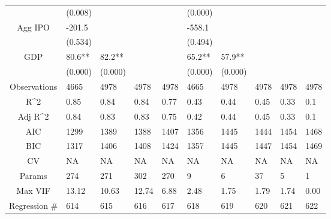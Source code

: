 \documentclass{article}
\begin{document}
\begin{table}[H]
\begin{tabular}{|clllllllll|}
   & (0.008) &  &  &  & (0.000) &  &  &  &  \\
  Agg IPO & -201.5 &  &  &  & -558.1 &  &  &  &  \\
   & (0.534) &  &  &  & (0.494) &  &  &  &  \\
  GDP & 80.6** & 82.2** &  &  & 65.2** & 57.9** &  &  &  \\
   & (0.000) & (0.000) &  &  & (0.000) & (0.000) &  &  &  \\
  \hline
 Observations & 4665 & 4978 & 4978 & 4978 & 4665 & 4978 & 4978 & 4978 & 4978 \\
  R^2 & 0.85 & 0.84 & 0.84 & 0.77 & 0.43 & 0.44 & 0.45 & 0.33 & 0.1 \\
  Adj R^2 & 0.84 & 0.83 & 0.83 & 0.75 & 0.42 & 0.44 & 0.45 & 0.33 & 0.1 \\
  AIC & 1299 & 1389 & 1388 & 1407 & 1356 & 1445 & 1444 & 1454 & 1468 \\
  BIC & 1317 & 1406 & 1408 & 1424 & 1357 & 1445 & 1447 & 1454 & 1469 \\
  CV & NA & NA & NA & NA & NA & NA & NA & NA & NA \\
  Params & 274 & 271 & 302 & 270 & 9 & 6 & 37 & 5 & 1 \\
  Max VIF & 13.12 & 10.63 & 12.74 & 6.88 & 2.48 & 1.75 & 1.79 & 1.74 & 0.00 \\
  Regression \# & 614 & 615 & 616 & 617 & 618 & 619 & 620 & 621 & 622 \\
   \hline
\end{tabular}

\end{table}
\end{document}
